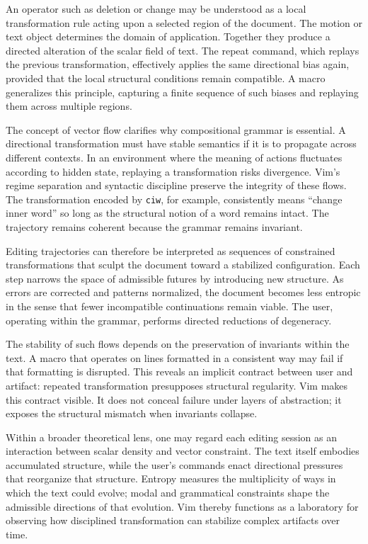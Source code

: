 \documentclass[12pt]{article}
\begin{document}
An operator such as deletion or change may be understood as a local transformation rule acting upon a selected region of the document. The motion or text object determines the domain of application. Together they produce a directed alteration of the scalar field of text. The repeat command, which replays the previous transformation, effectively applies the same directional bias again, provided that the local structural conditions remain compatible. A macro generalizes this principle, capturing a finite sequence of such biases and replaying them across multiple regions.

The concept of vector flow clarifies why compositional grammar is essential. A directional transformation must have stable semantics if it is to propagate across different contexts. In an environment where the meaning of actions fluctuates according to hidden state, replaying a transformation risks divergence. Vim’s regime separation and syntactic discipline preserve the integrity of these flows. The transformation encoded by \texttt{ciw}, for example, consistently means “change inner word” so long as the structural notion of a word remains intact. The trajectory remains coherent because the grammar remains invariant.

Editing trajectories can therefore be interpreted as sequences of constrained transformations that sculpt the document toward a stabilized configuration. Each step narrows the space of admissible futures by introducing new structure. As errors are corrected and patterns normalized, the document becomes less entropic in the sense that fewer incompatible continuations remain viable. The user, operating within the grammar, performs directed reductions of degeneracy.

The stability of such flows depends on the preservation of invariants within the text. A macro that operates on lines formatted in a consistent way may fail if that formatting is disrupted. This reveals an implicit contract between user and artifact: repeated transformation presupposes structural regularity. Vim makes this contract visible. It does not conceal failure under layers of abstraction; it exposes the structural mismatch when invariants collapse.

Within a broader theoretical lens, one may regard each editing session as an interaction between scalar density and vector constraint. The text itself embodies accumulated structure, while the user’s commands enact directional pressures that reorganize that structure. Entropy measures the multiplicity of ways in which the text could evolve; modal and grammatical constraints shape the admissible directions of that evolution. Vim thereby functions as a laboratory for observing how disciplined transformation can stabilize complex artifacts over time.
\end{document}
